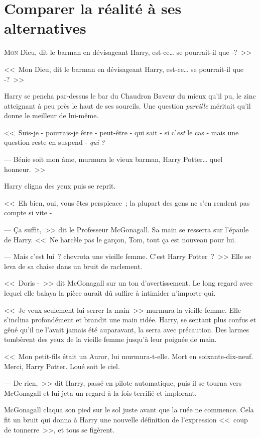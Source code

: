 \chapter{Comparer la réalité à ses alternatives}

\lettrine[ante=<<~]{M}{on} Dieu, dit le barman en dévisageant Harry, est-ce\ldots{} se pourrait-il que -?~>>

<<~Mon Dieu, dit le barman en dévisageant Harry, est-ce\ldots{} se pourrait-il que -?~>>

Harry se pencha par-dessus le bar du Chaudron Baveur du mieux qu'il pu, le zinc atteignant à peu près le haut de ses sourcils. Une question \emph{pareille} méritait qu'il donne le meilleur de lui-même.

<<~Suis-je - pourrais-je être - peut-être - qui sait - si c'\emph{est} le cas - mais une question reste en suspend - \emph{qui} \emph{?}

--- Bénie soit mon âme, murmura le vieux barman, Harry Potter\ldots{} quel honneur.~>>

Harry cligna des yeux puis se reprit.

<<~Eh bien, oui, vous êtes perspicace~; la plupart des gens ne s'en rendent pas compte si vite -

--- Ça suffit,~>> dit le Professeur McGonagall. Sa main se resserra sur l'épaule de Harry. <<~Ne harcèle pas le garçon, Tom, tout ça est nouveau pour lui.

--- Mais c'est lui~? chevrota une vieille femme. C'est Harry Potter~?~>> Elle se leva de sa chaise dans un bruit de raclement.

<<~Doris -~>> dit McGonagall sur un ton d'avertissement. Le long regard avec lequel elle balaya la pièce aurait dû suffire à intimider n'importe qui.

<<~Je veux seulement lui serrer la main~>> murmura la vieille femme. Elle s'inclina profondément et brandit une main ridée. Harry, se sentant plus confus et gêné qu'il ne l'avait jamais été auparavant, la serra avec précaution. Des larmes tombèrent des yeux de la vieille femme jusqu'à leur poignée de main.

<<~Mon petit-fils était un Auror, lui murmura-t-elle. Mort en soixante-dix-neuf. Merci, Harry Potter. Loué soit le ciel.

--- De rien,~>> dit Harry, passé en pilote automatique, puis il se tourna vers McGonagall et lui jeta un regard à la fois terrifié et implorant.

McGonagall claqua son pied sur le sol juste avant que la ruée ne commence. Cela fit un bruit qui donna à Harry une nouvelle définition de l'expression <<~coup de tonnerre~>>, et tous se figèrent.

